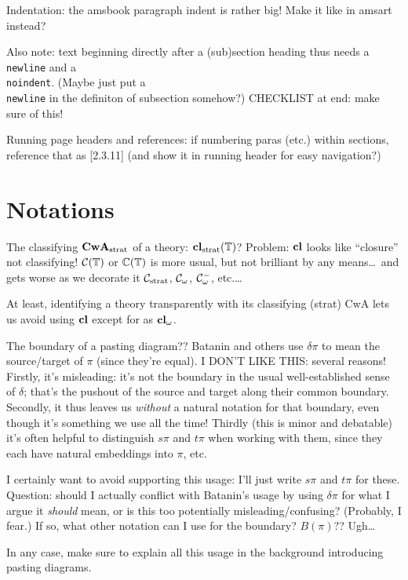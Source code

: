 \documentclass{amsart}
\begin{document}
Indentation: the amsbook paragraph indent is rather big!  Make it like in amsart instead?

Also note: text beginning directly after a (sub)section heading thus needs a \texttt{\\newline} and a \texttt{\\noindent}.  (Maybe just put a \texttt{\\newline} in the definiton of subsection somehow?)  CHECKLIST at end: make sure of this!

Running page headers and references: if numbering paras (etc.) within sections,  reference that as [2.3.11] (and show it in running header for easy navigation?)

\section{Notations}
\para The classifying $\mathbf{CwA}_{\textrm{strat}}$ of a theory: $\mathbf{cl}_{\textrm{strat}}(\mathbb{T})$?  Problem: $\mathbf{cl}$ looks like ``closure'' not classifying!  $\mathcal{C}(\mathbb{T})$ or $\mathbb{C}(\mathbb{T})$ is more usual, but not brilliant by any means\ldots\ and gets worse as we decorate it $\mathcal{C}_{\textrm{strat}}$, $\mathcal{C}_\omega$, $\mathcal{C}^-_\omega$, etc.\ldots

At least, identifying a theory transparently with its classifying (strat) CwA lets us avoid using $\mathbf{cl}$ except for as $\mathbf{cl}_\omega$.  

\para The boundary of a pasting diagram??  Batanin and others use $\delta \pi$ to mean the source/target of $\pi$ (since they're equal).  I DON'T LIKE THIS: several reasons!  Firstly, it's misleading: it's not the boundary in the usual well-established sense of $\delta$; that's the pushout of the source and target along their common boundary.  Secondly, it thus leaves us \emph{without} a natural notation for that boundary, even though it's something we use all the time!  Thirdly (this is minor and debatable) it's often helpful to distinguish $s\pi$ and $t\pi$ when working with them, since they each have natural embeddings into $\pi$, etc.

I certainly want to avoid supporting this usage: I'll just write $s\pi$ and $t\pi$ for these.  Question: should I actually conflict with Batanin's usage by using $\delta \pi$ for what I argue it \emph{should} mean, or is this too potentially misleading/confusing?  (Probably, I fear.)  If so, what other notation can I use for the boundary?  $B(\pi)$??  Ugh\ldots

In any case, make sure to explain all this usage in the background introducing pasting diagrams.
\end{document}
